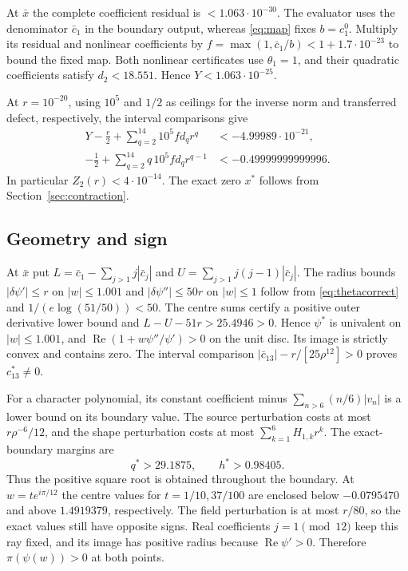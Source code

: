 \documentclass[11pt]{amsart}
\theoremstyle{remark}
\numberwithin{equation}{section}
\newcommand{\re}{\operatorname{Re}}
\begin{document}
At $\bar x$ the complete coefficient residual is
$<1.063\cdot10^{-30}$. The evaluator uses the denominator $\bar c_1$
in the boundary output, whereas \eqref{eq:map} fixes $b=c_1^0$.
Multiply its residual and nonlinear coefficients by
$f=\max(1,\bar c_1/b)<1+1.7\cdot10^{-23}$ to bound the fixed map.
Both nonlinear certificates use $\theta_1=1$, and their quadratic
coefficients satisfy $d_2<18.551$. Hence $Y<1.063\cdot10^{-25}$.

At $r=10^{-20}$, using $10^5$ and $1/2$ as ceilings for the inverse norm
and transferred defect, respectively, the interval comparisons give
\begin{align}
 Y-\frac r2+\sum_{q=2}^{14}10^5 f d_qr^q
        &<-4.99989\cdot10^{-21},\label{eq:r14poly}\\
 -\frac12+\sum_{q=2}^{14}q\,10^5 f d_qr^{q-1}
        &<-0.49999999999996.\label{eq:r14lip}
\end{align}
In particular $Z_2(r)<4\cdot10^{-14}$. The exact zero $x^*$ follows
from Section~\ref{sec:contraction}.

\subsection{Geometry and sign}
At $\bar x$ put $L=\bar c_1-\sum_{j>1}j|\bar c_j|$ and
$U=\sum_{j>1}j(j-1)|\bar c_j|$.
The radius bounds $|\delta\psi'|\le r$ on $|w|\le1.001$ and
$|\delta\psi''|\le50r$ on $|w|\le1$ follow from
\eqref{eq:thetacorrect} and $1/(e\log(51/50))<50$.
The centre sums certify a positive outer derivative lower bound and
$L-U-51r>25.4946>0$. Hence $\psi^*$ is univalent on
$|w|\le1.001$, and $\re(1+w\psi''/\psi')>0$ on the unit disc.
Its image is strictly convex and contains zero.
The interval comparison $|\bar c_{13}|-r/[25\rho^{12}]>0$
proves $c_{13}^*\ne0$.

For a character polynomial, its constant coefficient minus
$\sum_{n>6}(n/6)|v_n|$ is a lower bound on its boundary value.
The source perturbation costs at most $r\rho^{-6}/12$, and the shape
perturbation costs at most $\sum_{k=1}^6H_{1,k}r^k$.
The exact-boundary margins are
\begin{equation}\label{eq:r14positive}
 q^*>29.1875,\qquad h^*>0.98405.
\end{equation}
Thus the positive square root is obtained throughout the boundary.
At $w=t e^{i\pi/12}$ the centre values for $t=1/10,37/100$ are
enclosed below $-0.0795470$ and above $1.4919379$, respectively.
The field perturbation is at most $r/80$, so the exact values still
have opposite signs. Real coefficients $j=1\pmod{12}$ keep this ray
fixed, and its image has positive radius because $\re\psi'>0$.
Therefore $\pi(\psi(w))>0$ at both points.
\end{document}
